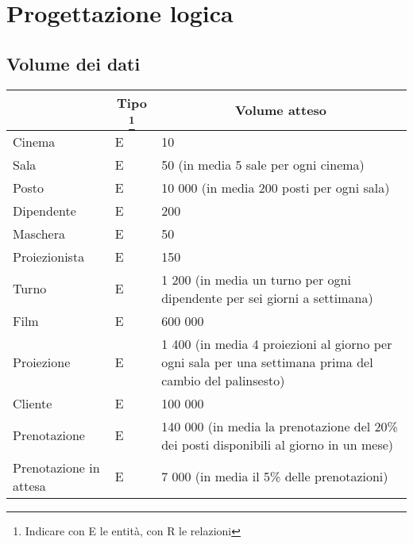 \section{Progettazione logica}

\subsection*{Volume dei dati}
%
%
\begin{tabularx}{\linewidth}{|X|l|X|}
    \hline
    \rowcolor{tblhdrcolor}
    \multicolumn{1}{|c|}{\textbf{Concetto nello schema}}
     & \multicolumn{1}{|c|}{\textbf{Tipo}
        \footnote{Indicare con E le entità, con R le relazioni}}
     & \multicolumn{1}{|c|}{\textbf{Volume atteso}}
    \\\hline
    Cinema
     & E
     & 10
    \\\hline
    Sala
     & E
     & 50 (in media 5 sale per ogni cinema)
    \\ \hline
    Posto
     & E
     & 10 000 (in media 200 posti per ogni sala)
    \\ \hline
    Dipendente
     & E
     & 200
    \\ \hline
    Maschera
     & E
     & 50
    \\ \hline
    Proiezionista
     & E
     & 150
    \\ \hline
    Turno
     & E
     & 1 200 (in media un turno per ogni dipendente per sei giorni a settimana)
    \\ \hline
    Film
     & E
     & 600 000
    \\ \hline
    Proiezione
     & E
     & 1 400 (in media 4 proiezioni al giorno per ogni sala per una settimana
    prima del cambio del palinsesto)
    \\ \hline
    Cliente
     & E
     & 100 000
    \\ \hline
    Prenotazione
     & E
     & 140 000 (in media la prenotazione del 20\% dei posti disponibili al
    giorno in un mese)
    \\ \hline
    Prenotazione in attesa
     & E
     & 7 000 (in media il 5\% delle prenotazioni)
    \\ \hline

\end{tabularx}
